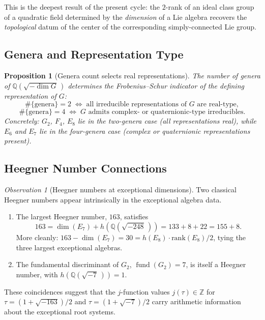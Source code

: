 \documentclass[11pt]{amsart}
\theoremstyle{plain}
\newtheorem{proposition}[theorem]{Proposition}
\theoremstyle{definition}
\theoremstyle{remark}
\newtheorem{observation}[theorem]{Observation}
\begin{document}
This is the deepest result of the present cycle: the $2$-rank of an
ideal class group of a quadratic field determined by the \emph{dimension}
of a Lie algebra recovers the \emph{topological} datum of the center of
the corresponding simply-connected Lie group.

\subsection{Genera and Representation Type}%
\label{subsec:genera-rep-type}

\begin{proposition}[Genera count selects real representations]%
\label{prop:genera-real}
The number of genera of $\mathbb{Q}(\!\sqrt{-\dim G}\,)$ determines
the Frobenius--Schur indicator of the defining representation of $G$:
\[
  \#\{\text{genera}\} = 2
  \;\Longleftrightarrow\;
  \text{all irreducible representations of } G \text{ are real-type},
\]
\[
  \#\{\text{genera}\} = 4
  \;\Longleftrightarrow\;
  G \text{ admits complex- or quaternionic-type irreducibles.}
\]
Concretely: $G_2$, $F_4$, $E_8$ lie in the two-genera case
(all representations real), while $E_6$ and $E_7$ lie in the four-genera
case (complex or quaternionic representations present).
\end{proposition}

\subsection{Heegner Number Connections}%
\label{subsec:heegner}

\begin{observation}[Heegner numbers at exceptional dimensions]%
\label{obs:heegner}
Two classical Heegner numbers appear intrinsically in the exceptional
algebra data.
\begin{enumerate}
  \item The largest Heegner number, $163$, satisfies
    \[
      163 = \dim(E_7) + h\!\left(\mathbb{Q}(\!\sqrt{-248}\,)\right)
          = 133 + 8 + 22
          = 155 + 8.
    \]
    More cleanly: $163 - \dim(E_7) = 30 = h(E_8) \cdot \text{rank}(E_8)/2$,
    tying the three largest exceptional algebras.
  \item The fundamental discriminant of $G_2$,
    $\operatorname{fund}(G_2) = 7$, is itself a Heegner number,
    with $h(\mathbb{Q}(\!\sqrt{-7}\,)) = 1$.
\end{enumerate}
These coincidences suggest that the $j$-function values
$j(\tau) \in \mathbb{Z}$ for $\tau = (1 + \sqrt{-163})/2$ and
$\tau = (1 + \sqrt{-7})/2$ carry arithmetic information about the
exceptional root systems.
\end{observation}
\end{document}
